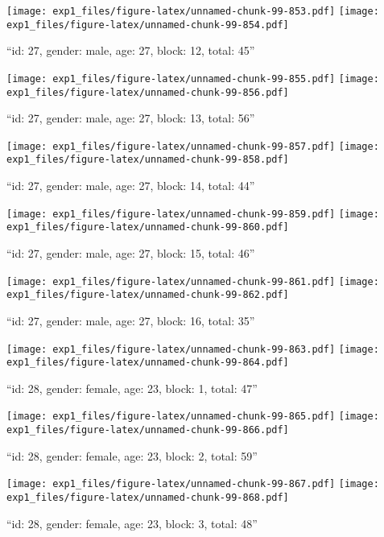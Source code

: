 \documentclass[,]{article}
\begin{document}
\texttt{[image: exp1\_files/figure-latex/unnamed-chunk-99-853.pdf]}
\texttt{[image: exp1\_files/figure-latex/unnamed-chunk-99-854.pdf]}

\newpage
[1] 

``id: 27, gender: male, age: 27, block: 12, total: 45''

\texttt{[image: exp1\_files/figure-latex/unnamed-chunk-99-855.pdf]}
\texttt{[image: exp1\_files/figure-latex/unnamed-chunk-99-856.pdf]}

\newpage
[1] 

``id: 27, gender: male, age: 27, block: 13, total: 56''

\texttt{[image: exp1\_files/figure-latex/unnamed-chunk-99-857.pdf]}
\texttt{[image: exp1\_files/figure-latex/unnamed-chunk-99-858.pdf]}

\newpage
[1] 

``id: 27, gender: male, age: 27, block: 14, total: 44''

\texttt{[image: exp1\_files/figure-latex/unnamed-chunk-99-859.pdf]}
\texttt{[image: exp1\_files/figure-latex/unnamed-chunk-99-860.pdf]}

\newpage
[1] 

``id: 27, gender: male, age: 27, block: 15, total: 46''

\texttt{[image: exp1\_files/figure-latex/unnamed-chunk-99-861.pdf]}
\texttt{[image: exp1\_files/figure-latex/unnamed-chunk-99-862.pdf]}

\newpage
[1] 

``id: 27, gender: male, age: 27, block: 16, total: 35''

\texttt{[image: exp1\_files/figure-latex/unnamed-chunk-99-863.pdf]}
\texttt{[image: exp1\_files/figure-latex/unnamed-chunk-99-864.pdf]}

\newpage
[1] 

``id: 28, gender: female, age: 23, block: 1, total: 47''

\texttt{[image: exp1\_files/figure-latex/unnamed-chunk-99-865.pdf]}
\texttt{[image: exp1\_files/figure-latex/unnamed-chunk-99-866.pdf]}

\newpage
[1] 

``id: 28, gender: female, age: 23, block: 2, total: 59''

\texttt{[image: exp1\_files/figure-latex/unnamed-chunk-99-867.pdf]}
\texttt{[image: exp1\_files/figure-latex/unnamed-chunk-99-868.pdf]}

\newpage
[1] 

``id: 28, gender: female, age: 23, block: 3, total: 48''
\end{document}
